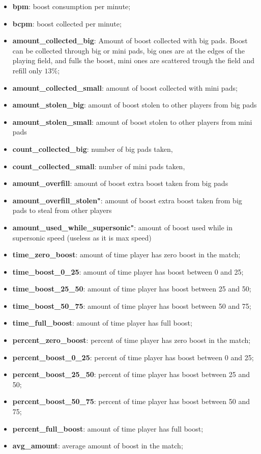 \begin{itemize}
    \item \textbf{bpm}: boost consumption per minute;
    \item \textbf{bcpm}: boost collected per minute;
    \item \textbf{amount\_collected\_big}: Amount of boost collected with big pads. Boost can be collected through big or mini pads, big ones are at the edges of the playing field, and fulls the boost, mini ones are scattered trough the field and refill only $13 \%$;
    \item \textbf{amount\_collected\_small}: amount of boost collected with mini pads;
    \item \textbf{amount\_stolen\_big}: amount of boost stolen to other players from big pads
    \item \textbf{amount\_stolen\_small}: amount of boost stolen to other players from mini pads
    \item \textbf{count\_collected\_big}: number of big pads taken,
    \item \textbf{count\_collected\_small}: number of mini pads taken,
    \item \textbf{amount\_overfill}: amount of boost extra boost taken from big pads
    \item \textbf{amount\_overfill\_stolen"}: amount of boost extra boost taken from big pads to steal from other players
    \item \textbf{amount\_used\_while\_supersonic"}: amount of boost used while in supersonic speed (useless as it is max speed)
    \item \textbf{time\_zero\_boost}: amount of time player has zero boost in the match;
    \item \textbf{time\_boost\_0\_25}: amount of time player has boost between 0 and 25;
    \item \textbf{time\_boost\_25\_50}: amount of time player has boost between 25 and 50;
    \item \textbf{time\_boost\_50\_75}: amount of time player has boost between 50 and 75;
    \item \textbf{time\_full\_boost}: amount of time player has full boost;
    \item \textbf{percent\_zero\_boost}: percent of time player has zero boost in the match;
    \item \textbf{percent\_boost\_0\_25}: percent of time player has boost between 0 and 25;
    \item \textbf{percent\_boost\_25\_50}: percent of time player has boost between 25 and 50;
    \item \textbf{percent\_boost\_50\_75}: percent of time player has boost between 50 and 75;
    \item \textbf{percent\_full\_boost}: amount of time player has full boost;
    \item \textbf{avg\_amount}: average amount of boost in the match;
\end{itemize}
